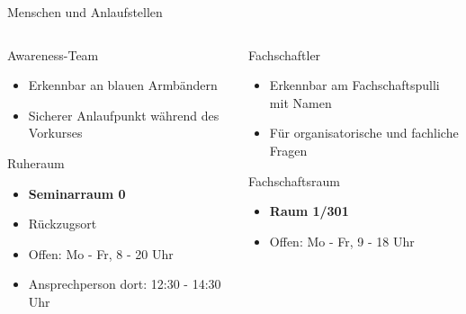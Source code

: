 \documentclass[t,aspectratio=1610, 12pt]{beamer} %
\begin{document}
\begin{frame}{Menschen und Anlaufstellen}
	\begin{columns}
		\begin{column}{.5\textwidth}
			\begin{block}{Awareness-Team}
				\begin{itemize}
					\item Erkennbar an blauen Armbändern
					\item Sicherer Anlaufpunkt während des Vorkurses
				\end{itemize}
			\end{block}
			\begin{block}{Ruheraum}
				\begin{itemize}
					\item \textbf{Seminarraum 0}
					\item Rückzugsort
					\item Offen: Mo - Fr, 8 - 20 Uhr
					\item Ansprechperson dort: 12:30 - 14:30 Uhr
				\end{itemize}
			\end{block}
		\end{column}
		\begin{column}{.5\textwidth}
			\begin{block}{Fachschaftler}
				\begin{itemize}
					\item Erkennbar am Fachschaftspulli mit Namen
					\item Für organisatorische und fachliche Fragen
				\end{itemize}
			\end{block}
			\begin{block}{Fachschaftsraum}
				\begin{itemize}
					\item \textbf{Raum 1/301}
					\item Offen: Mo - Fr, 9 - 18 Uhr
				\end{itemize}
			\end{block}
		\end{column}
	\end{columns}
\end{frame}
\end{document}

